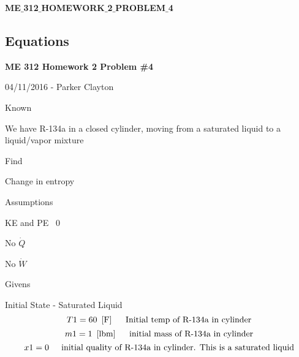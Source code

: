 \documentclass[10pt,fleqn]{article}
\newcommand{\V}[1]{\mbox{$ #1 $}}
\newcommand{\I}{\mbox{\hspace{0.20in}}}
\begin{document}
\begin{center}
\bf \mbox{ME$\_$312$\_$HOMEWORK$\_$2$\_$PROBLEM$\_$4}
\vspace{0.2 in}
\end{center}
\subsection*{Equations}

\vspace{0.10in}
\noindent
\bf ME 312 Homework 2 Problem \#4

\vspace{0.10in}
\noindent
\rm 04/11/2016 - Parker Clayton\newline


\vspace{0.10in}
\noindent
\rm Known

\vspace{0.10in}
\noindent
\rm We have R-134a in a closed cylinder, moving from a saturated liquid to a liquid/vapor mixture

\vspace{0.10in}
\noindent
\rm Find

\vspace{0.10in}
\noindent
\rm Change in entropy

\vspace{0.10in}
\noindent
\rm Assumptions

\vspace{0.10in}
\noindent
\rm KE and PE ~0

\vspace{0.10in}
\noindent
\rm No $\dot{Q}$

\vspace{0.10in}
\noindent
\rm No $\dot{W}$

\vspace{0.10in}
\noindent
\rm Givens

\vspace{0.10in}
\noindent
\rm Initial State - Saturated Liquid
\begin{equation}
\label{EES Eqn:1}
\V{T1} =60   \   \left[ \rm F \right] 				 
\mbox{\I Initial temp of R-134a in cylinder}
\end{equation}
\begin{equation}
\label{EES Eqn:2}
\V{m1} = 1   \   \left[ \rm lbm \right]				 
\mbox{\I initial mass of R-134a in cylinder}
\end{equation}
\begin{equation}
\label{EES Eqn:3}
\V{x1} =0					 
\mbox{\I initial quality of R-134a in cylinder. This is a saturated liquid}
\end{equation}
\end{document}
